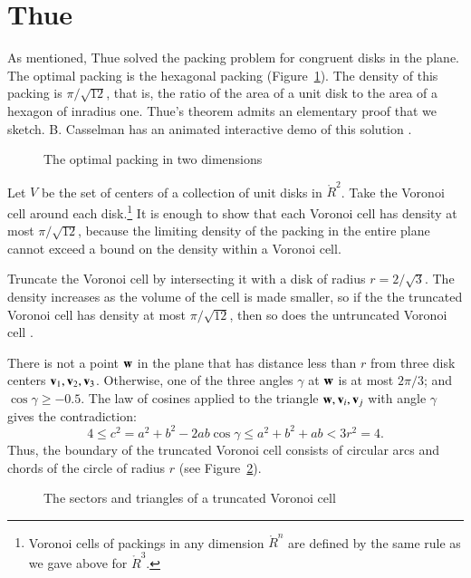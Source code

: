 \section{Thue}\label{sec:thue}


As mentioned, Thue solved the packing problem for congruent disks in
the plane.  The optimal packing is the hexagonal packing
(Figure~\ref{fig:2D-hex}).  The density of this packing is
$\pi/\sqrt{12}$, that is, the ratio of the area of a unit disk to the area of a
hexagon of inradius one.  Thue's theorem admits an elementary proof that
we sketch.    B. Casselman has an animated interactive demo of this
solution \cite{casselman:pennies}.

\begin{figure}[htb]
  \centering
  \caption{The optimal packing in two dimensions}
  \label{fig:2D-hex}
\end{figure}

Let $V$ be the set of centers of a collection of unit disks in
$\ring{R}^2$.  Take the Voronoi cell around each
disk.\footnote{Voronoi cells of packings in any dimension $\ring{R}^n$
  are defined by the same rule as we gave above for $\ring{R}^3$.}   It
is enough to show that each Voronoi cell has density at most
$\pi/\sqrt{12}$, because the limiting density of the packing in the entire plane cannot exceed
a bound on the density within a Voronoi cell.  


Truncate the Voronoi cell by intersecting it with a disk of radius
$r=2/\sqrt3$.   The density increases as the volume of the cell is made smaller,
so if the the truncated Voronoi cell
has density at most $\pi/\sqrt{12}$, then so does the untruncated Voronoi cell .

There is not a point ${\mathbf w}$ in the plane that has distance less than $r$
from three disk centers ${\mathbf v}_1,{\mathbf v}_2,{\mathbf v}_3$.  Otherwise, one of the three
angles $\gamma$ at ${\mathbf w}$ is at most $2\pi/3$; and $\cos\gamma\ge -0.5$.
The law of cosines applied to the triangle ${\mathbf w},{\mathbf v}_i,{\mathbf v}_j$ with angle
$\gamma$ gives the contradiction:
   \begin{displaymath}
   4 \le c^2 = a^2 + b^2 - 2 a b \cos\gamma 
   \le a^2 + b^2 + a b < 3r^2 = 4.
   \end{displaymath}
Thus, the boundary of the truncated Voronoi cell consists of circular
arcs and chords of the circle of radius $r$ (see Figure~\ref{fig:2D-proof}).

\begin{figure}[htb]
  \centering
  \caption{The sectors and triangles of a truncated Voronoi cell}
  \label{fig:2D-proof}
\end{figure}


